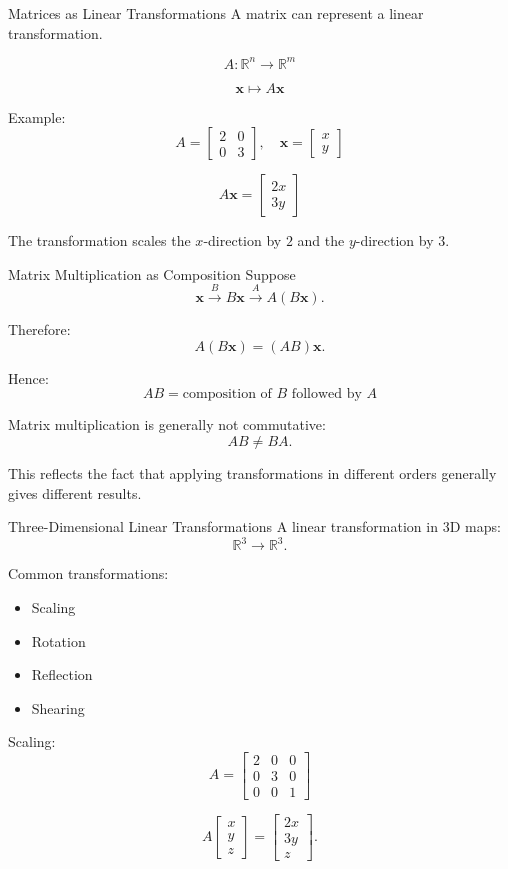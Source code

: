 \documentclass[aspectratio=169]{beamer}
\begin{document}
\begin{frame}{Matrices as Linear Transformations}
A matrix can represent a linear transformation.

\[
A:\mathbb R^n\rightarrow\mathbb R^m
\]

\[
\mathbf x\mapsto A\mathbf x
\]

Example:
\[
A=
\begin{bmatrix}
2&0\\
0&3
\end{bmatrix},
\quad
\mathbf x=
\begin{bmatrix}x\\y\end{bmatrix}
\]

\[
A\mathbf x=
\begin{bmatrix}
2x\\3y
\end{bmatrix}
\]

The transformation scales the $x$-direction by $2$ and the $y$-direction by $3$.
\end{frame}

\begin{frame}{Matrix Multiplication as Composition}
Suppose
\[
\mathbf x\xrightarrow{B}B\mathbf x
\xrightarrow{A}A(B\mathbf x).
\]

Therefore:
\[
A(B\mathbf x)=(AB)\mathbf x.
\]

Hence:
\[
\boxed{AB=\text{composition of }B\text{ followed by }A}
\]

Matrix multiplication is generally not commutative:
\[
AB\neq BA.
\]

This reflects the fact that applying transformations in different orders generally gives different results.
\end{frame}

\begin{frame}{Three-Dimensional Linear Transformations}
A linear transformation in 3D maps:
\[
\mathbb R^3\rightarrow\mathbb R^3.
\]

Common transformations:

\begin{itemize}
\item Scaling
\item Rotation
\item Reflection
\item Shearing
\end{itemize}

Scaling:
\[
A=
\begin{bmatrix}
2&0&0\\
0&3&0\\
0&0&1
\end{bmatrix}
\]

\[
A
\begin{bmatrix}x\\y\\z\end{bmatrix}
=
\begin{bmatrix}2x\\3y\\z\end{bmatrix}.
\]
\end{frame}
\end{document}
